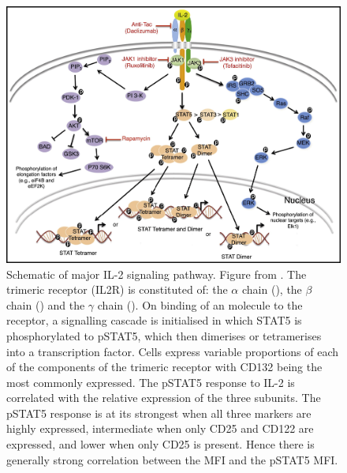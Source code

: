 \begin{figure}[h]
\centering
\includegraphics[scale=.9]{figures/IL2-pathway.jpg}
{ Schematic of major IL-2 signaling pathway. }
{
    Figure from \citet{Liao:2013jt}.
    The trimeric  receptor (IL2R) is constituted of: the $\alpha$ chain  (), the $\beta$ chain  ()
    and the $\gamma$ chain  ().
    On binding of an  molecule to the receptor, a signalling cascade is initialised in which STAT5 is phosphorylated to pSTAT5, which then dimerises or tetramerises into a transcription factor.
    Cells express variable proportions of each of the components of the trimeric receptor with CD132 being the most commonly expressed.
    The pSTAT5 response to IL-2 is correlated with the relative expression of the three subunits.
    The pSTAT5 response is at its strongest when all three markers are highly expressed, intermediate when only CD25 and CD122 are expressed, and lower when only CD25 is present.
    Hence there is generally strong correlation between the  MFI and the pSTAT5 MFI.
}
\end{figure}


